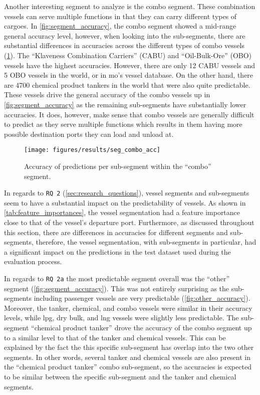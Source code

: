 Another interesting segment to analyze is the combo segment. These combination vessels can serve multiple functions in that they can carry different types of cargoes. In \cref{fig:segment_accuracy}, the combo segment showed a mid-range general accuracy level, however, when looking into the sub-segments, there are substantial differences in accuracies across the different types of combo vessels (\cref{fig:combo_accuracy}). The ``Klaveness Combination Carriers'' (CABU) and ``Oil-Bulk-Ore'' (OBO) vessels have the highest accuracies. However, there are only 12 CABU vessels and 5 OBO vessels in the world, or in \acrfull{mo}'s vessel database. On the other hand, there are 4700 chemical product tankers in the world that were also quite predictable. These vessels drive the general accuracy of the combo vessels up in \cref{fig:segment_accuracy} as the remaining sub-segments have substantially lower accuracies. It does, however, make sense that combo vessels are generally difficult to predict as they serve multiple functions which results in them having more possible destination ports they can load and unload at.

\begin{figure}[htbp]
    \centering
    \texttt{[image: figures/results/seg\_combo\_acc]}
    \caption{Accuracy of predictions per sub-segment within the ``combo'' segment.}
    \label{fig:combo_accuracy}
\end{figure}

In regards to \texttt{RQ 2} (\cref{sec:research_questions}), vessel segments and sub-segments seem to have a substantial impact on the predictability of vessels. As shown in \cref{tab:feature_importances}, the vessel segmentation had a feature importance close to that of the vessel's departure port. Furthermore, as discussed throughout this section, there are differences in accuracies for different segments and sub-segments, therefore, the vessel segmentation, with sub-segments in particular, had a significant impact on the predictions in the test dataset used during the evaluation process.

In regards to \texttt{RQ 2a} the most predictable segment overall was the ``other'' segment (\cref{fig:segment_accuracy}). This was not entirely surprising as the sub-segments including passenger vessels are very predictable (\cref{fig:other_accuracy}). Moreover, the tanker, chemical, and combo vessels were similar in their accuracy levels, while \acrshort{lpg}, dry bulk, and \acrshort{lng} vessels were slightly less predictable. The sub-segment ``chemical product tanker'' drove the accuracy of the combo segment up to a similar level to that of the tanker and chemical vessels. This can be explained by the fact the this specific sub-segment has overlap into the two other segments. In other words, several tanker and chemical vessels are also present in the ``chemical product tanker'' combo sub-segment, so the accuracies is expected to be similar between the specific sub-segment and the tanker and chemical segments.


